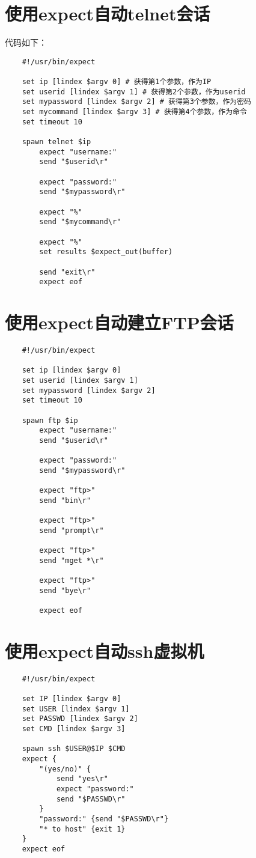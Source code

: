 \documentclass[a4paper,left=2.5cm,right=2.5cm,11pt]{article}
\begin{document}
\section{使用expect自动telnet会话}
	代码如下：
	\begin{lstlisting}
	#!/usr/bin/expect

	set ip [lindex $argv 0] # 获得第1个参数，作为IP
	set userid [lindex $argv 1] # 获得第2个参数，作为userid
	set mypassword [lindex $argv 2] # 获得第3个参数，作为密码
	set mycommand [lindex $argv 3] # 获得第4个参数，作为命令
	set timeout 10

	spawn telnet $ip
		expect "username:"
		send "$userid\r"

		expect "password:"
		send "$mypassword\r"

		expect "%"
		send "$mycommand\r"

		expect "%"
		set results $expect_out(buffer)

		send "exit\r"
		expect eof
	\end{lstlisting}

\section{使用expect自动建立FTP会话}
	\begin{lstlisting}
	#!/usr/bin/expect

	set ip [lindex $argv 0]
	set userid [lindex $argv 1]
	set mypassword [lindex $argv 2]
	set timeout 10

	spawn ftp $ip
		expect "username:"
		send "$userid\r"

		expect "password:"
		send "$mypassword\r"

		expect "ftp>"
		send "bin\r"

		expect "ftp>"
		send "prompt\r"

		expect "ftp>"
		send "mget *\r"

		expect "ftp>"
		send "bye\r"

		expect eof
	\end{lstlisting}

\section{使用expect自动ssh虚拟机}
	\begin{lstlisting}
	#!/usr/bin/expect

	set IP [lindex $argv 0]
	set USER [lindex $argv 1]
	set PASSWD [lindex $argv 2]
	set CMD [lindex $argv 3]

	spawn ssh $USER@$IP $CMD
	expect {
		"(yes/no)" {
			send "yes\r"
			expect "password:"
			send "$PASSWD\r"
		}
		"password:" {send "$PASSWD\r"}
		"* to host" {exit 1}
	}
	expect eof
	\end{lstlisting}
\end{document}
